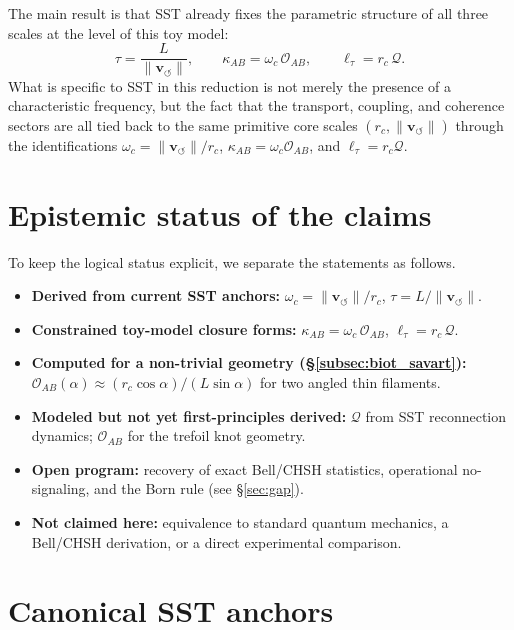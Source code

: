 \documentclass[11pt]{article}
\newcommand{\vnorm}{\lVert \mathbf{v}_{\!\boldsymbol{\circlearrowleft}}\rVert}
\newcommand{\rc}{r_c}
\begin{document}
The main result is that SST already fixes the parametric structure of all three scales at the level of this toy model:
\[
    \tau = \frac{L}{\vnorm}, \qquad
    \kappa_{AB} = \omega_c\,\mathcal{O}_{AB}, \qquad
    \ell_\tau = \rc\,\mathcal{Q}.
\]
What is specific to SST in this reduction is not merely the presence of a characteristic frequency, but the fact that the transport, coupling, and coherence sectors are all tied back to the same primitive core scales $(\rc, \vnorm)$ through the identifications $\omega_c = \vnorm/\rc$, $\kappa_{AB} = \omega_c \mathcal{O}_{AB}$, and $\ell_\tau = \rc\mathcal{Q}$.

\section{Epistemic status of the claims}

To keep the logical status explicit, we separate the statements as follows.

\begin{itemize}
    \item \textbf{Derived from current SST anchors:}
    $\omega_c = \vnorm/\rc$, \quad $\tau = L/\vnorm$.
    \item \textbf{Constrained toy-model closure forms:}
    $\kappa_{AB} = \omega_c\,\mathcal{O}_{AB}$, \quad $\ell_\tau = \rc\,\mathcal{Q}$.
    \item \textbf{Computed for a non-trivial geometry (§\ref{subsec:biot_savart}):}
    $\mathcal{O}_{AB}(\alpha) \approx (r_c \cos\alpha)/(L\sin\alpha)$ for two angled thin filaments.
    \item \textbf{Modeled but not yet first-principles derived:}
    $\mathcal{Q}$ from SST reconnection dynamics; $\mathcal{O}_{AB}$ for the trefoil knot geometry.
    \item \textbf{Open program:}
    recovery of exact Bell/CHSH statistics, operational no-signaling, and the Born rule (see §\ref{sec:gap}).
    \item \textbf{Not claimed here:}
    equivalence to standard quantum mechanics, a Bell/CHSH derivation, or a direct experimental comparison.
\end{itemize}

\section{Canonical SST anchors}
\end{document}
